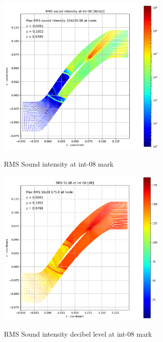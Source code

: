\begin{figure}[ht]
  \centering
  \includegraphics[width=0.75\textwidth]{Figures/int-08-rms-sil.png} \label{int-08-rms-sil}
  \caption{RMS Sound intensity at int-08 mark}
  
  \vspace*{\floatsep}%

  \includegraphics[width=0.75\textwidth]{Figures/int-08-rms-sildb.png} \label{int-08-rms-sildb}
  \caption{RMS Sound intensity decibel level at int-08 mark}
\end{figure}



